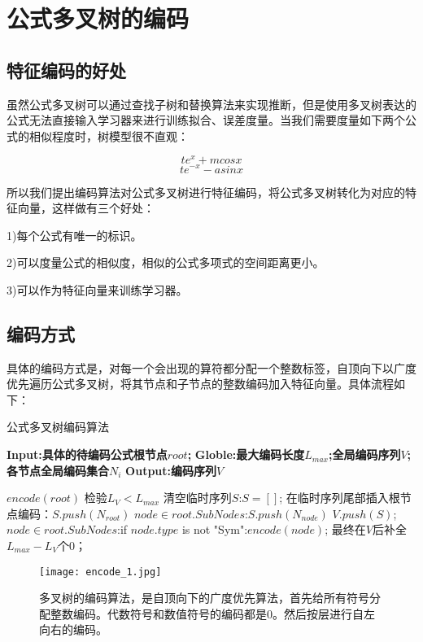 \documentclass[runningheads]{llncs}
\begin{document}
\section{公式多叉树的编码}

\subsection{特征编码的好处}
虽然公式多叉树可以通过查找子树和替换算法来实现推断，但是使用多叉树表达的公式无法直接输入学习器来进行训练拟合、误差度量。当我们需要度量如下两个公式的相似程度时，树模型很不直观：

$$te^x+mcosx$$
$$te^{-x}-asinx$$

所以我们提出编码算法对公式多叉树进行特征编码，将公式多叉树转化为对应的特征向量，这样做有三个好处：

1)每个公式有唯一的标识。

2)可以度量公式的相似度，相似的公式多项式的空间距离更小。

3)可以作为特征向量来训练学习器。

\subsection{编码方式}
具体的编码方式是，对每一个会出现的算符都分配一个整数标签，自顶向下以广度优先遍历公式多叉树，将其节点和子节点的整数编码加入特征向量。具体流程如下：


\begin{algorithm}[t]
\caption{公式多叉树编码算法} %
\hspace*{0.02in} {\bf Input:具体的待编码公式根节点$root$; } 
\hspace*{0.02in} {\bf Globle:最大编码长度$L_{max}$;全局编码序列$V$;各节点全局编码集合${N_i}$ }
\hspace*{0.02in} {\bf Output:编码序列$V$} 
\begin{algorithmic}[1]
\State $encode(root)$
\State 检验$L_V<L_{max}$
\State 清空临时序列$S$:$S=[]$;
\State 在临时序列尾部插入根节点编码：$S.push(N_{root})$
\State \For $node \in root.SubNodes$:$S.push(N_{node})$\EndFor
\State $V.push(S)$;
\State \For $node \in root.SubNodes$:if $node.type$ is not "Sym":$encode(node)$;\EndFor
\State 最终在$V$后补全$L_{max}-L_{V}$个0；
\end{algorithmic}
\end{algorithm}


\begin{figure}[H]
\centering
\texttt{[image: encode\_1.jpg]}
\caption{多叉树的编码算法，是自顶向下的广度优先算法，首先给所有符号分配整数编码。代数符号和数值符号的编码都是0。然后按层进行自左向右的编码。}
\end{figure}
\end{document}
